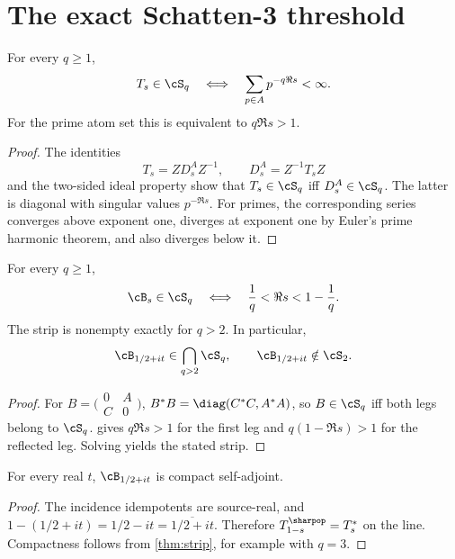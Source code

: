 \section{The exact Schatten-3 threshold}
\label{sec:strip}

\begin{theorem}
\label{thm:similarity}
For every $q\ge1$,
\[
 T_s\in\cS_q
 \quad\Longleftrightarrow\quad
 \sum_{p\in A}p^{-q\Re s}<\infty.
\]
For the prime atom set this is equivalent to $q\Re s>1$.
\end{theorem}

\begin{proof}
The identities
\[
 T_s=ZD_s^AZ^{-1},\qquad D_s^A=Z^{-1}T_sZ
\]
and the two-sided ideal property show that $T_s\in\cS_q$ iff
$D_s^A\in\cS_q$.  The latter is diagonal with singular values
$p^{-\Re s}$.  For primes, the corresponding series converges above
exponent one, diverges at exponent one by Euler's prime harmonic
theorem, and also diverges below it.
\end{proof}

\begin{theorem}
\label{thm:strip}
For every $q\ge1$,
\[
 \cB_s\in\cS_q
 \quad\Longleftrightarrow\quad
 \frac1q<\Re s<1-\frac1q.
\]
The strip is nonempty exactly for $q>2$.  In particular,
\[
 \cB_{1/2+it}\in\bigcap_{q>2}\cS_q,
 \qquad
 \cB_{1/2+it}\notin\cS_2.
\]
\end{theorem}

\begin{proof}
For $B=\bigl(\begin{smallmatrix}0&A\\C&0\end{smallmatrix}\bigr)$,
$B^*B=\diag(C^*C,A^*A)$, so $B\in\cS_q$ iff both legs belong to
$\cS_q$.   gives
$q\Re s>1$ for the first leg and $q(1-\Re s)>1$ for the reflected
leg.  Solving yields the stated strip.
\end{proof}

\begin{proposition}
\label{prop:selfadjoint}
For every real $t$, $\cB_{1/2+it}$ is compact self-adjoint.
\end{proposition}

\begin{proof}
The incidence idempotents are source-real, and
$1-(1/2+it)=1/2-it=\overline{1/2+it}$.  Therefore
$T_{1-s}^{\sharpop}=T_s^*$ on the line.  Compactness follows from
\cref{thm:strip}, for example with $q=3$.
\end{proof}

